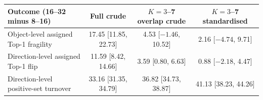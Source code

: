 \begin{tabular}{@{}lccc@{}}
\toprule
Outcome (16--32 minus 8--16) & Full crude & $K=3$--7 overlap crude & $K=3$--7 standardised \\
\midrule
Object-level assigned Top-1 fragility & 17.45 [11.85, 22.73] & 4.53 [$-1.46$, 10.52] & 2.16 [$-4.74$, 9.71] \\
Direction-level assigned Top-1 flip & 11.59 [8.42, 14.66] & 3.59 [0.80, 6.63] & 0.88 [$-2.18$, 4.47] \\
Direction-level positive-set turnover & 33.16 [31.35, 34.79] & 36.82 [34.73, 38.87] & 41.13 [38.23, 44.26] \\
\bottomrule
\end{tabular}
